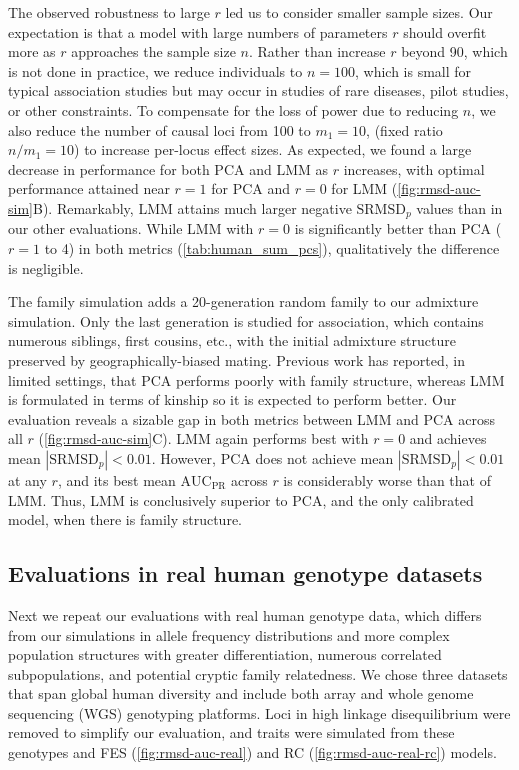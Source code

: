 \documentclass[11pt]{article}
\newcommand{\rmsd}{\text{SRMSD}_p}
\newcommand{\auc}{\text{AUC}_\text{PR}}
\begin{document}
The observed robustness to large $r$ led us to consider smaller sample sizes.
Our expectation is that a model with large numbers of parameters $r$ should overfit more as $r$ approaches the sample size $n$.
Rather than increase $r$ beyond 90, which is not done in practice, we reduce individuals to $n = 100$, which is small for typical association studies but may occur in studies of rare diseases, pilot studies, or other constraints.
To compensate for the loss of power due to reducing $n$, we also reduce the number of causal loci from 100 to $m_1 = 10$, (fixed ratio $n / m_1 = 10$) to increase per-locus effect sizes.
As expected, we found a large decrease in performance for both PCA and LMM as $r$ increases, with optimal performance attained near $r=1$ for PCA and $r=0$ for LMM (\cref{fig:rmsd-auc-sim}B).
Remarkably, LMM attains much larger negative $\rmsd$ values than in our other evaluations.
While LMM with $r=0$ is significantly better than PCA ($r=1$ to 4) in both metrics (\cref{tab:human_sum_pcs}), qualitatively the difference is negligible.

The family simulation adds a 20-generation random family to our admixture simulation.
Only the last generation is studied for association, which contains numerous siblings, first cousins, etc., with the initial admixture structure preserved by geographically-biased mating.
Previous work has reported, in limited settings, that PCA performs poorly with family structure, whereas LMM is formulated in terms of kinship so it is expected to perform better.
Our evaluation reveals a sizable gap in both metrics between LMM and PCA across all $r$ (\cref{fig:rmsd-auc-sim}C).
LMM again performs best with $r=0$ and achieves mean $|\rmsd| < 0.01$.
However, PCA does not achieve mean $|\rmsd| < 0.01$ at any $r$, and its best mean $\auc$ across $r$ is considerably worse than that of LMM.
Thus, LMM is conclusively superior to PCA, and the only calibrated model, when there is family structure.

\subsection{Evaluations in real human genotype datasets}

Next we repeat our evaluations with real human genotype data, which differs from our simulations in allele frequency distributions and more complex population structures with greater differentiation, numerous correlated subpopulations, and potential cryptic family relatedness.
We chose three datasets that span global human diversity and include both array and whole genome sequencing (WGS) genotyping platforms.
Loci in high linkage disequilibrium were removed to simplify our evaluation, and traits were simulated from these genotypes and FES (\cref{fig:rmsd-auc-real}) and RC (\cref{fig:rmsd-auc-real-rc}) models.
\end{document}
